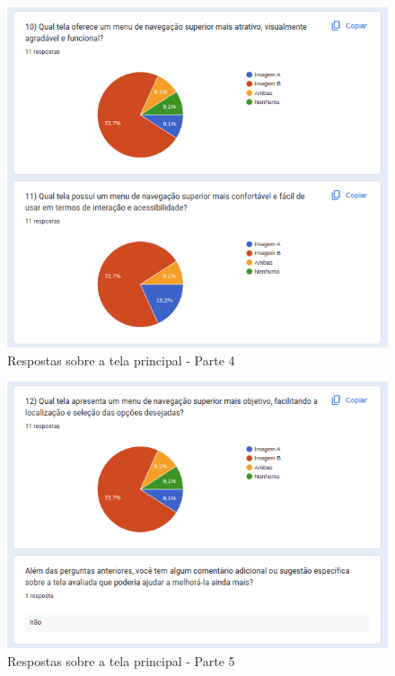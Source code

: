 \begin{figure}[!h]
	\begin{center}
	    \includegraphics[scale=0.6]{figs/Answers/Professionals/15.png}
	\end{center}
	\caption{\label{APC_TP04}Respostas sobre a tela principal - Parte 4}
\end{figure}


\begin{figure}[!h]
	\begin{center}
	    \includegraphics[scale=0.5]{figs/Answers/Professionals/16.png}
	\end{center}
	\caption{\label{APC_TP05}Respostas sobre a tela principal - Parte 5}
\end{figure}

